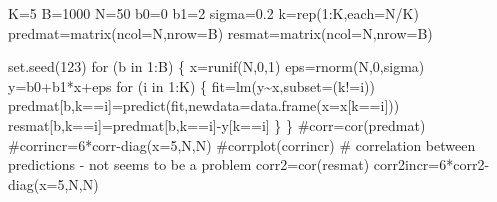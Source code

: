 \documentclass[
  letterpaper,
  DIV=11,
  numbers=noendperiod]{scrartcl}
\newenvironment{Shaded}{\begin{snugshade}}{\end{snugshade}}
\newcommand{\AttributeTok}[1]{\textcolor[rgb]{0.40,0.45,0.13}{#1}}
\newcommand{\CommentTok}[1]{\textcolor[rgb]{0.37,0.37,0.37}{#1}}
\newcommand{\ControlFlowTok}[1]{\textcolor[rgb]{0.00,0.23,0.31}{#1}}
\newcommand{\DecValTok}[1]{\textcolor[rgb]{0.68,0.00,0.00}{#1}}
\newcommand{\FloatTok}[1]{\textcolor[rgb]{0.68,0.00,0.00}{#1}}
\newcommand{\FunctionTok}[1]{\textcolor[rgb]{0.28,0.35,0.67}{#1}}
\newcommand{\NormalTok}[1]{\textcolor[rgb]{0.00,0.23,0.31}{#1}}
\newcommand{\OtherTok}[1]{\textcolor[rgb]{0.00,0.23,0.31}{#1}}
\newcommand{\SpecialCharTok}[1]{\textcolor[rgb]{0.37,0.37,0.37}{#1}}
\begin{document}
\begin{Shaded}
\begin{Highlighting}[]
\NormalTok{K}\OtherTok{=}\DecValTok{5}
\NormalTok{B}\OtherTok{=}\DecValTok{1000}
\NormalTok{N}\OtherTok{=}\DecValTok{50}
\NormalTok{b0}\OtherTok{=}\DecValTok{0}
\NormalTok{b1}\OtherTok{=}\DecValTok{2}
\NormalTok{sigma}\OtherTok{=}\FloatTok{0.2}
\NormalTok{k}\OtherTok{=}\FunctionTok{rep}\NormalTok{(}\DecValTok{1}\SpecialCharTok{:}\NormalTok{K,}\AttributeTok{each=}\NormalTok{N}\SpecialCharTok{/}\NormalTok{K) }
\NormalTok{predmat}\OtherTok{=}\FunctionTok{matrix}\NormalTok{(}\AttributeTok{ncol=}\NormalTok{N,}\AttributeTok{nrow=}\NormalTok{B)}
\NormalTok{resmat}\OtherTok{=}\FunctionTok{matrix}\NormalTok{(}\AttributeTok{ncol=}\NormalTok{N,}\AttributeTok{nrow=}\NormalTok{B)}

\FunctionTok{set.seed}\NormalTok{(}\DecValTok{123}\NormalTok{)}
\ControlFlowTok{for}\NormalTok{ (b }\ControlFlowTok{in} \DecValTok{1}\SpecialCharTok{:}\NormalTok{B)}
\NormalTok{\{}
\NormalTok{  x}\OtherTok{=}\FunctionTok{runif}\NormalTok{(N,}\DecValTok{0}\NormalTok{,}\DecValTok{1}\NormalTok{)}
\NormalTok{  eps}\OtherTok{=}\FunctionTok{rnorm}\NormalTok{(N,}\DecValTok{0}\NormalTok{,sigma)}
\NormalTok{  y}\OtherTok{=}\NormalTok{b0}\SpecialCharTok{+}\NormalTok{b1}\SpecialCharTok{*}\NormalTok{x}\SpecialCharTok{+}\NormalTok{eps}
  \ControlFlowTok{for}\NormalTok{ (i }\ControlFlowTok{in} \DecValTok{1}\SpecialCharTok{:}\NormalTok{K)}
\NormalTok{  \{}
\NormalTok{    fit}\OtherTok{=}\FunctionTok{lm}\NormalTok{(y}\SpecialCharTok{\textasciitilde{}}\NormalTok{x,}\AttributeTok{subset=}\NormalTok{(k}\SpecialCharTok{!=}\NormalTok{i))}
\NormalTok{    predmat[b,k}\SpecialCharTok{==}\NormalTok{i]}\OtherTok{=}\FunctionTok{predict}\NormalTok{(fit,}\AttributeTok{newdata=}\FunctionTok{data.frame}\NormalTok{(}\AttributeTok{x=}\NormalTok{x[k}\SpecialCharTok{==}\NormalTok{i]))}
\NormalTok{    resmat[b,k}\SpecialCharTok{==}\NormalTok{i]}\OtherTok{=}\NormalTok{predmat[b,k}\SpecialCharTok{==}\NormalTok{i]}\SpecialCharTok{{-}}\NormalTok{y[k}\SpecialCharTok{==}\NormalTok{i]}
\NormalTok{  \}}
\NormalTok{\}}
\CommentTok{\#corr=cor(predmat)}
\CommentTok{\#corrincr=6*corr{-}diag(x=5,N,N)}
\CommentTok{\#corrplot(corrincr)}
\CommentTok{\# correlation between predictions {-} not seems to be a problem}
\NormalTok{corr2}\OtherTok{=}\FunctionTok{cor}\NormalTok{(resmat)}
\NormalTok{corr2incr}\OtherTok{=}\DecValTok{6}\SpecialCharTok{*}\NormalTok{corr2}\SpecialCharTok{{-}}\FunctionTok{diag}\NormalTok{(}\AttributeTok{x=}\DecValTok{5}\NormalTok{,N,N)}
\end{Highlighting}
\end{Shaded}
\end{document}
